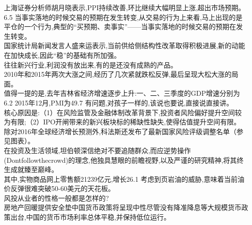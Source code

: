 \documentclass[runningheads,a4paper]{llncs}
\begin{document}
\begin{CJK*}{UTF8}{gbsn}
\colorbox{green!30}{上海证券分析师胡月晓}表示,\colorbox{green!30}{PPI}持续改善,\colorbox{green!30}{环比}继续大幅明显上涨,超出\colorbox{green!30}{市场预期}。\\
6.5%
当事实落地的时候\colorbox{green!30}{交易}的预期在发生转变,从\colorbox{green!30}{交易}的行为上来看,马上出现的是\colorbox{green!30}{平仓}的一个行为,典型的“买预期、卖事实”——当事实落地的时候\colorbox{red!30}{交易}的预期在发生转变。\\
\colorbox{green!30}{国家统计局新闻发言人盛来运}表示,当前\colorbox{green!30}{供给侧结构性改革}取得积极进展,新的\colorbox{blue!30}{动能}在加快成长,因此“稳”的基础有所加强。\\
往往\colorbox{green!30}{新兴行业},\colorbox{green!30}{利润}没有放出来,有的是还没有成熟的产品。\\
2010年和2015年两次\colorbox{blue!30}{大涨}之间,经历了几次\colorbox{blue!30}{紧就跌松反弹},最后呈现大松大涨的局面。\\
值得一提的是,去年\colorbox{green!30}{吉林省经济}\colorbox{blue!30}{增速}逐步上升:一、二、三季度的\colorbox{green!30}{GDP}\colorbox{blue!30}{增速}分别为6.2%
2015年12月,PMI为49.7%
有问题,对孩子一样的,该说也要说,直接说直接讲。\\
核心原因是:（1）在风险监管及金融体制改革背景下,投资者风险偏好提升空间较为有限;（2）IPO开闸带来的新兴板块标的稀缺性缺失,使得估值提升空间有限。\\
除对2016年全球经济增长预测外,科法斯还发布了最新国家风险评级调整名单（参见图表）。\\
在投资及生活领域,坦伯顿深信绝对不要追随群众,而应逆势操作(Dontfollowthecrowd)的理念,他独具慧眼的前瞻视野,以及严谨的研究精神,将其终生成就臻至巅峰。\\
其中,实物商品网上零售额21239亿元,增长26.1%
考虑到页岩油的威胁,意味着当前油价反弹很难突破50-60美元的天花板。\\
风投从业者的性格一般都是怎样的?\\
房地产回暖提供安全垫中国货币政策将呈现中性尽管没有降准降息等大规模货币政策出台,中国的货币市场利率总体平稳,并保持低位运行。\\

\end{CJK*}
\end{document}
